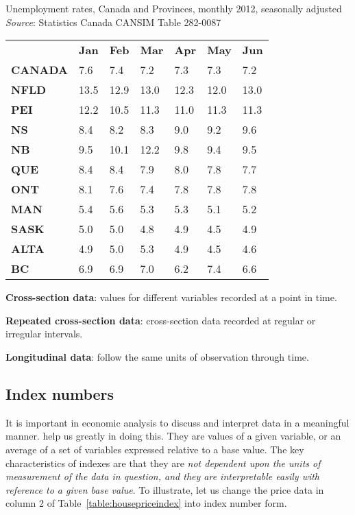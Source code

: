 \begin{Table}{25em}{Unemployment rates, Canada and Provinces, monthly 2012, seasonally adjusted \label{table:unemprate2012}}{\centering \textit{Source}: Statistics Canada CANSIM Table 282-0087}
\begin{tabu} to 35em {|X[2.5,l]X[1,c]X[1,c]X[1,c]X[1,c]X[1,c]X[1,c]|}
\hline 
{}					& \textbf{Jan} & \textbf{Feb} & \textbf{Mar} & \textbf{Apr} & \textbf{May}  & \textbf{Jun} \\
						\textbf{CANADA}	& 7.6 & 7.4 & 7.2 & 7.3 & 7.3 & 7.2 \\
	\textbf{NFLD}	& 13.5 & 12.9 & 13.0 & 12.3 & 12.0 & 13.0 \\
						\textbf{PEI} 	& 12.2 & 10.5 & 11.3 & 11.0 & 11.3 & 11.3 \\ 
	\textbf{NS} 	& 8.4 & 8.2 & 8.3 & 9.0 & 9.2 & 9.6 \\
						\textbf{NB} 	& 9.5 & 10.1 & 12.2 & 9.8 & 9.4 & 9.5 \\
	\textbf{QUE} 	& 8.4 & 8.4 & 7.9 & 8.0 & 7.8 & 7.7 \\ 
						\textbf{ONT} 	& 8.1 & 7.6 & 7.4 & 7.8 & 7.8 & 7.8 \\ 
	\textbf{MAN} 	& 5.4 & 5.6 & 5.3 & 5.3 & 5.1 & 5.2 \\
						\textbf{SASK} 	& 5.0 & 5.0 & 4.8 & 4.9 & 4.5 & 4.9 \\ 
	\textbf{ALTA}	& 4.9 & 5.0 & 5.3 & 4.9 & 4.5 & 4.6 \\ 
						\textbf{BC}		& 6.9 & 6.9 & 7.0 & 6.2 & 7.4 & 6.6 \\ \hline 
\end{tabu}
\end{Table}

\begin{DefBox}
\textbf{Cross-section data}: values for different variables recorded at a point in time.

\textbf{Repeated cross-section data}: cross-section data recorded at regular or irregular intervals.

\textbf{Longitudinal data}: follow the same units of observation through time.
\end{DefBox}

\subsection*{Index numbers}

It is important in economic analysis to discuss and interpret data in a meaningful manner.  help us greatly in doing this. They are values of a given variable, or an average of a set of variables expressed relative to a base value.  The key characteristics of indexes are that they are \textit{not dependent upon the units of measurement of the data in question, and they are interpretable easily with reference to a given base value}. To illustrate, let us change the price data in column 2 of Table~\ref{table:housepriceindex} into index number form.

